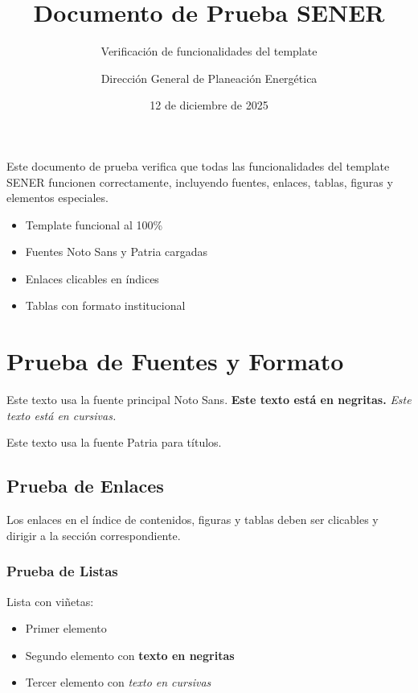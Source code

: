 \documentclass{sener2025}
\title{Documento de Prueba SENER}
\subtitle{Verificación de funcionalidades del template}
\author{Dirección General de Planeación Energética}
\date{12 de diciembre de 2025}
\begin{document}
\portadafondo

\tableofcontents
\newpage

\listafiguras
\newpage

\listatablas
\newpage

\begin{resumenejecutivo}
Este documento de prueba verifica que todas las funcionalidades del template SENER funcionen correctamente, incluyendo fuentes, enlaces, tablas, figuras y elementos especiales.
\end{resumenejecutivo}

\begin{datosclave}
  \begin{itemize}
    \item Template funcional al 100\%
    \item Fuentes Noto Sans y Patria cargadas
    \item Enlaces clicables en índices
    \item Tablas con formato institucional
  \end{itemize}
\end{datosclave}

\section{Prueba de Fuentes y Formato}

Este texto usa la fuente principal Noto Sans. \textbf{Este texto está en negritas.} \textit{Este texto está en cursivas.}

{\patriafont Este texto usa la fuente Patria para títulos.}

\subsection{Prueba de Enlaces}

Los enlaces en el índice de contenidos, figuras y tablas deben ser clicables y dirigir a la sección correspondiente.

\subsubsection{Prueba de Listas}

Lista con viñetas:
\begin{itemize}
  \item Primer elemento
  \item Segundo elemento con \textbf{texto en negritas}
  \item Tercer elemento con \textit{texto en cursivas}
\end{itemize}
\end{document}
